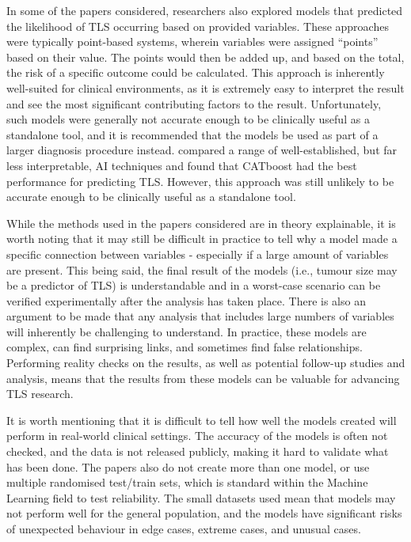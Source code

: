 \documentclass{article}
\begin{document}
In some of the papers considered, researchers also explored models that predicted the likelihood of TLS occurring based on provided variables. These approaches were typically point-based systems, wherein variables were assigned “points” based on their value. The points would then be added up, and based on the total, the risk of a specific outcome could be calculated. This approach is inherently well-suited for clinical environments, as it is extremely easy to interpret the result and see the most significant contributing factors to the result. Unfortunately, such models were generally not accurate enough to be clinically useful as a standalone tool, and it is recommended that the models be used as part of a larger diagnosis procedure instead. \cite{mato2004predictive}  compared a range of well-established, but far less interpretable, AI techniques and found that CATboost had the best performance for predicting TLS. However, this approach was still unlikely to be accurate enough to be clinically useful as a standalone tool.

While the methods used in the papers considered are in theory explainable, it is worth noting that it may still be difficult in practice to tell why a model made a specific connection between variables - especially if a large amount of variables are present. This being said, the final result of the models (i.e., tumour size may be a predictor of TLS) is understandable and in a worst-case scenario can be verified experimentally after the analysis has taken place. There is also an argument to be made that any analysis that includes large numbers of variables will inherently be challenging to understand. In practice, these models are complex, can find surprising links, and sometimes find false relationships. Performing reality checks on the results, as well as potential follow-up studies and analysis, means that the results from these models can be valuable for advancing TLS research.

It is worth mentioning that it is difficult to tell how well the models created will perform in real-world clinical settings. The accuracy of the models is often not checked, and the data is not released publicly, making it hard to validate what has been done. The papers also do not create more than one model, or use multiple randomised test/train sets, which is standard within the Machine Learning field to test reliability. The small datasets used mean that models may not perform well for the general population, and the models have significant risks of unexpected behaviour in edge cases, extreme cases, and unusual cases.
\end{document}

